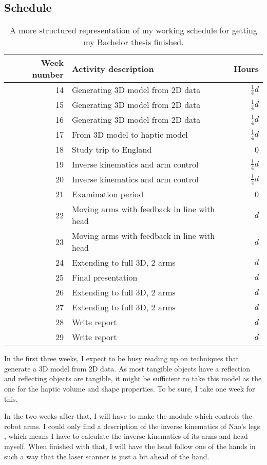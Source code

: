 \documentclass[10pt, a4paper]{article}
\begin{document}
\begin{multicols}{2}
\section{Schedule}
\begin{table*}
\caption{A more structured representation of my working schedule for getting
my Bachelor thesis finished. \label{tab:schedule}}
\begin{tabular}{rlr}
Week number & Activity description & Hours \\
\hline
14 & Generating 3D model from 2D data & $\frac{1}{4}d$\\
15 & Generating 3D model from 2D data & $\frac{1}{4}d$\\
16 & Generating 3D model from 2D data & $\frac{1}{4}d$\\
17 & From 3D model to haptic model & $\frac{1}{4}d$\\
18 & Study trip to England & 0\\
19 & Inverse kinematics and arm control & $\frac{1}{4}d$\\
20 & Inverse kinematics and arm control & $\frac{1}{4}d$\\
21 & Examination period & 0\\
22 & Moving arms with feedback in line with head & $d$\\
23 & Moving arms with feedback in line with head & $d$\\
24 & Extending to full 3D, 2 arms & $d$\\
25 & Final presentation& $d$\\
26 & Extending to full 3D, 2 arms & $d$\\
27 & Extending to full 3D, 2 arms & $d$\\
28 & Write report & $d$\\
29 & Write report & $d$\\
\end{tabular}
\end{table*}

In the first three weeks, I expect to be busy reading up on techniques that
generate a 3D model from 2D data.  As most tangible objects have a reflection
and reflecting objects are tangible, it might be sufficient to take this model
as the one for the haptic volume and shape properties.  To be sure, I take one
week for this.

In the two weeks after that, I will have to make the module which controls the
robot arms.  I could only find a description of the inverse kinematics of
Nao's legs \cite{BHuman2009}, which means I have to calculate the inverse
kinematics of its arms and head myself.  When finished with that, I will have
the head follow one of the hands in such a way that the laser scanner is just
a bit ahead of the hand.


\end{multicols}
\end{document}

